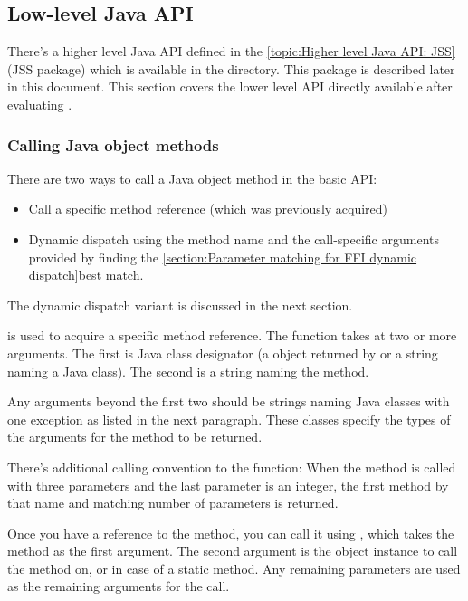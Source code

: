 \documentclass[10pt]{book}
\begin{document}
\subsection{Low-level Java API}

There's a higher level Java API defined in the
\ref{topic:Higher level Java API: JSS}(JSS package) which is available
in the  directory. This package is described later in this
document.  This section covers the lower level API directly available
after evaluating .

\subsubsection{Calling Java object methods}

There are two ways to call a Java object method in the basic API:

\begin{itemize}
\item Call a specific method reference (which was previously acquired)
\item Dynamic dispatch using the method name and
  the call-specific arguments provided by finding the
  \ref{section:Parameter matching for FFI dynamic dispatch}{best match}.
\end{itemize}

The dynamic dispatch variant is discussed in the next section.

 is used to acquire a specific method reference.
The function takes at two or more arguments. The first is Java class designator
(a  object returned by  or a string naming
a Java class). The second is a string naming the method.

Any arguments beyond the first two should be strings naming Java classes with
one exception as listed in the next paragraph. These
classes specify the types of the arguments for the method to be returned.

There's additional calling convention to the  function:
When the method is called with three parameters and the last parameter is an
integer, the first method by that name and matching number of parameters is
returned.

Once you have a reference to the method, you can call it using ,
which takes the method as the first argument. The second argument is the
object instance to call the method on, or  in case of a static method.
Any remaining parameters are used as the remaining arguments for the call.
\end{document}
